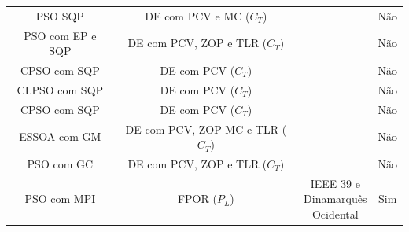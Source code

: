 \documentclass[
	12pt,				%
	openany,			%
	twoside,			%
	a4paper,			%
	chapter=TITLE,		%
	section=Title,		%
	subsection=Title,	%
	subsubsection=Title,%
	english,			%
	french,				%
	spanish,			%
	brazil			%
	]{abntex2}
\begin{document}
\begin{ERRATA}
\begin{table}[h!]
\begin{tabular}{cccc}
    \makecell{PSO SQP\\\tiny\cite{ep-pso-sqp}} &  \makecell{DE com PCV e MC\\($C_T$)}   & \makecell{-}  & Não    \\ 

    \makecell{PSO com EP e SQP\\\tiny\cite{ep-pso-sqp}} &  \makecell{DE com PCV,\\ZOP e TLR\\($C_T$)}   & \makecell{-}  & Não    \\
    \makecell{CPSO com SQP\\\tiny\cite{cpso_sqp}} &  \makecell{DE com PCV\\($C_T$)}   & \makecell{-}  & Não    \\ 
    
    \makecell{CLPSO com SQP\\\tiny\cite{clpso3}} &  \makecell{DE com PCV\\($C_T$)}   & \makecell{-}  & Não    \\
    \makecell{CPSO com SQP\\\tiny\cite{cpso_sqp}} &  \makecell{DE com PCV\\($C_T$)}   & \makecell{-}  & Não    \\ 


    \makecell{ESSOA com GM\\\tiny\cite{pso_grad}} &  \makecell{DE com PCV, ZOP\\MC e TLR\\($C_T$)}   & \makecell{-}  & Não    \\ 

    \makecell{PSO com GC \\\tiny\cite{HPSO}} &  \makecell{DE com PCV,\\ZOP e TLR\\($C_T$)}   & \makecell{-}  & Não    \\ 

    \makecell{PSO com MPI\\\tiny\cite{pso_mpi}} &  \makecell{FPOR\\($P_L$)}   & \makecell{IEEE 39 e\\Dinamarquês\\Ocidental}  & Sim    \\ 
    
    

\end{tabular}
\end{table}
\end{ERRATA}
\end{document}
